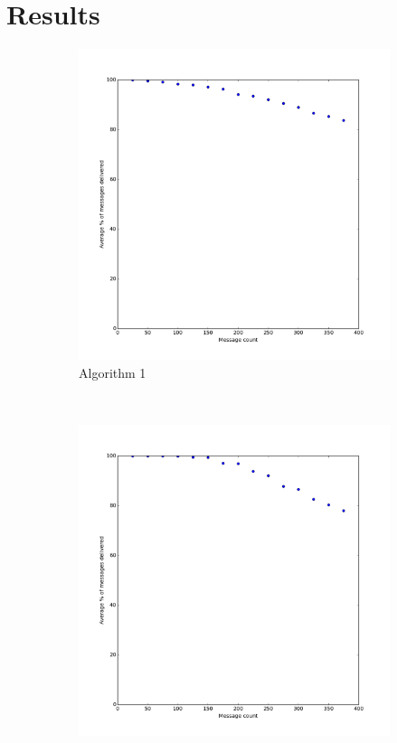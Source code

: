 \documentclass[bsc,frontabs,twoside,singlespacing,parskip,deptreport]{infthesis}     %
\begin{document}
\section{Results}
\begin{figure}
  	\vspace{-25pt}
    \centering
    \begin{subfigure}[b]{0.3\textwidth}
        \includegraphics[width=\textwidth]{results/BasicShare_Prob0}
        \caption{Algorithm 1}
        \label{fig:results/BasicShare_Prob0}
    \end{subfigure}
    ~ %
    \begin{subfigure}[b]{0.3\textwidth}
        \includegraphics[width=\textwidth]{results/BasicShare_Prob40}

\end{subfigure}
\end{figure}
\end{document}
